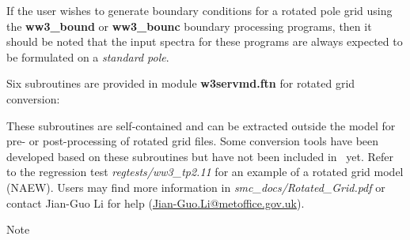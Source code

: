 If the user wishes to generate boundary conditions for a rotated pole grid using
the {\bf ww3\_bound} or {\bf ww3\_bounc} boundary processing programs, then it
should be noted that the input spectra for these programs are always expected
to be formulated on a \emph{standard pole}.

Six subroutines are provided in module {\bf w3servmd.ftn} for rotated grid
conversion:
\begin{vlist}
\end{vlist}
These subroutines are self-contained and can be extracted outside the model
for pre- or post-processing of rotated grid files.  Some conversion tools have
been developed based on these subroutines but have not been included in \ws\
yet. Refer to the regression test \emph{regtests/ww3\_tp2.11} for an example
of a rotated grid model (NAEW).  Users may find more information in
\emph{smc\_docs/Rotated\_Grid.pdf} or contact Jian-Guo Li for help
(\url{Jian-Guo.Li@metoffice.gov.uk}).

Note
